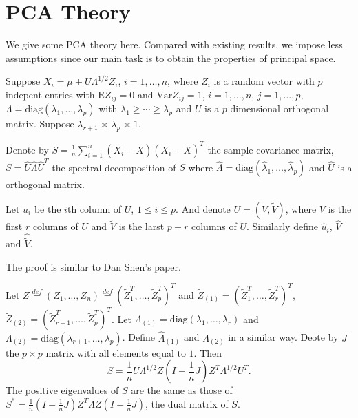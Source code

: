 \section{PCA Theory}

We give some PCA theory here. Compared with existing results, we impose less assumptions since our main task is to obtain the properties of principal space.
    \begin{assumption}\label{PCAassump}
    Suppose $X_i=\mu +U\Lambda^{1/2}Z_i$, $i=1,\ldots,n$, where $Z_{i}$ is a random vector with $p$ indepent entries with $\mathrm{E}Z_{ij}=0$ and $\mathrm{Var}Z_{ij}=1$, $i=1,\ldots,n$, $j=1,\ldots,p$, $\Lambda=\mathrm{diag}(\lambda_1,\ldots,\lambda_p)$ with $\lambda_1\geq\cdots\geq \lambda_p$ and $U$ is a $p$ dimensional orthogonal matrix.
    Suppose  $\lambda_{r+1}\asymp \lambda_p\asymp 1$. 
    \end{assumption}


    Denote by $S=\frac{1}{n}\sum_{i=1}^n (X_i-\bar{X}){(X_i-\bar{X})}^T$ the sample covariance matrix, $S=\hat{U}\hat{\Lambda}\hat{U}^T$ the spectral decomposition of $S$ where $\hat{\Lambda}=\mathrm{diag}(\hat{\lambda}_1,\ldots,\hat{\lambda}_p)$ and $\hat{U}$ is a orthogonal matrix.
    
    Let $u_i$ be the $i$th column of $U$, $1\leq i\leq p$. And denote $U=(V,\tilde{V})$, where $V$ is the first $r$ columns of $U$ and $\tilde{V}$ is the larst $p-r$ columns of $U$. Similarly define $\hat{u}_i$, $\hat{V}$ and $\hat{\tilde{V}}$.

The proof is similar to Dan Shen's paper.

    Let $Z\overset{def}{=}(Z_1,\ldots,Z_n)\overset{def}{=}{(\tilde{Z}_1^T,\ldots,\tilde{Z}_p^T)}^T$ and $\tilde{Z}_{(1)}={(\tilde{Z}_1^T,\ldots,\tilde{Z}_r^T)}^T$, $\tilde{Z}_{(2)}={(\tilde{Z}_{r+1}^T,\ldots,\tilde{Z}_p^T)}^T$.
    Let $\Lambda_{(1)}=\mathrm{diag}(\lambda_1,\ldots,\lambda_r)$ and $\Lambda_{(2)}=\mathrm{diag}(\lambda_{r+1},\ldots,\lambda_p)$. Define $\hat{\Lambda}_{(1)}$ and $\hat{\Lambda}_{(2)}$ in a similar way.
    Deote by $J$ the $p\times p$ matrix with all elements equal to $1$. Then
    \begin{equation*}
        S=\frac{1}{n}U\Lambda^{1/2}Z(I-\frac{1}{n}J)Z^T \Lambda^{1/2} U^T.
    \end{equation*}
    The positive eigenvalues of $S$ are the same as those of  $S^*=\frac{1}{n}(I-\frac{1}{n}J)Z^T \Lambda Z (I-\frac{1}{n}J)$, the dual matrix of $S$.


